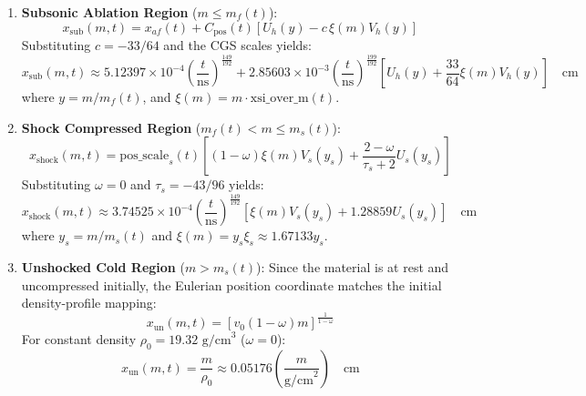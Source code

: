 \documentclass[11pt]{article}
\begin{document}
\begin{enumerate}
    \item \textbf{Subsonic Ablation Region} ($m \le m_f(t)$):
    \begin{equation}
        x_{\text{sub}}(m,t) = x_{af}(t) + C_{\text{pos}}(t) \left[ U_h(y) - c \, \xi(m) V_h(y) \right]
    \end{equation}
    Substituting $c = -33/64$ and the CGS scales yields:
    \begin{equation}
        x_{\text{sub}}(m,t) \approx 5.12397 \times 10^{-4} \left(\frac{t}{\text{ns}}\right)^{\frac{149}{192}} + 2.85603 \times 10^{-3} \left(\frac{t}{\text{ns}}\right)^{\frac{199}{192}} \left[ U_h(y) + \frac{33}{64} \xi(m) V_h(y) \right] \quad \text{cm}
    \end{equation}
    where $y = m/m_f(t)$, and $\xi(m) = m \cdot \text{xsi\_over\_m}(t)$.

    \item \textbf{Shock Compressed Region} ($m_f(t) < m \le m_s(t)$):
    \begin{equation}
        x_{\text{shock}}(m,t) = \text{pos\_scale}_s(t) \left[ (1-\omega)\xi(m) V_s(y_s) + \frac{2-\omega}{\tau_s+2} U_s(y_s) \right]
    \end{equation}
    Substituting $\omega = 0$ and $\tau_s = -43/96$ yields:
    \begin{equation}
        x_{\text{shock}}(m,t) \approx 3.74525 \times 10^{-4} \left(\frac{t}{\text{ns}}\right)^{\frac{149}{192}} \left[ \xi(m) V_s(y_s) + 1.28859 U_s(y_s) \right] \quad \text{cm}
    \end{equation}
    where $y_s = m/m_s(t)$ and $\xi(m) = y_s \xi_s \approx 1.67133 y_s$.

    \item \textbf{Unshocked Cold Region} ($m > m_s(t)$):
    Since the material is at rest and uncompressed initially, the Eulerian position coordinate matches the initial density-profile mapping:
    \begin{equation}
        x_{\text{un}}(m,t) = \left[ v_0 (1-\omega) m \right]^{\frac{1}{1-\omega}}
    \end{equation}
    For constant density $\rho_0 = 19.32 \text{ g/cm}^3$ ($\omega = 0$):
    \begin{equation}
        x_{\text{un}}(m,t) = \frac{m}{\rho_0} \approx 0.05176 \left( \frac{m}{\text{g/cm}^2} \right) \quad \text{cm}
    \end{equation}
\end{enumerate}
\end{document}
